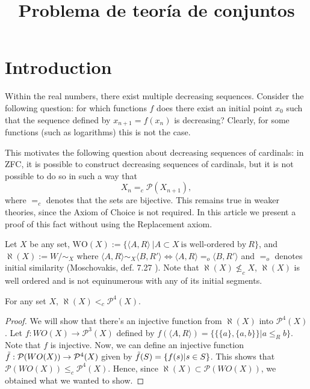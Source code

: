 \documentclass{article}
\title{Problema de teoría de conjuntos}
\begin{document}
	

\section*{Introduction}

Within the real numbers, there exist multiple decreasing sequences. Consider the following question: for which functions \(f\) does there exist an initial point \(x_0\) such that the sequence defined by \(x_{n+1} = f(x_n)\) is decreasing? Clearly, for some functions (such as logarithms) this is not the case.

This motivates the following question about decreasing sequences of cardinals: in ZFC, it is possible to construct decreasing sequences of cardinals, but it is not possible to do so in such a way that
\[
X_n =_c \mathcal{P}(X_{n+1}),
\]
where $=_c$ denotes that the sets are bijective. This remains true in weaker theories, since the Axiom of Choice is not required. In this article we present a proof of this fact without using the Replacement axiom.

\begin{definition}\label{aleph}
    Let $X$ be any set, $\text{WO}(X):=\{\langle A,R\rangle\ |A\subset X \ \text{is well-ordered by}\ R\}$, 
    and $\aleph(X):= W/{\sim_X}$ 
    where $\langle A,R\rangle \sim_X \langle B, R'\rangle \Longleftrightarrow \langle A, R\rangle =_o \langle B, R'\rangle$ and $=_o$ denotes initial similarity (Moschovakis, def. 7.27 \cite{Moscho}).
    Note that $\aleph(X)\nleq_c X$, $\aleph(X)$ is well ordered and is not equinumerous with any of its initial segments.
\end{definition}


\begin{theorem}
	For any set $X$, $\aleph(X)<_c \mathcal{P}^4(X)$.
\end{theorem}

\begin{proof}
We will show that there's an injective function from $\aleph(X)$ into $\mathcal{P}^4(X)$. Let $f:WO(X)\rightarrow \mathcal{P}^3(X)$ defined by $f(\langle A,R\rangle) = \{\{\{a\},\{a,b\}\}| a\leq_R b\}$. Note that $f$ is injective. Now, we can define an injective function $\Tilde{f}: \mathcal{P} (WO(X)) \rightarrow \mathcal{P}^4(X)$ given by $\Tilde{f}(S) = \{f(s) | s\in S\}$. This shows that $\mathcal{P} (WO(X)) \leq_c \mathcal{P}^4(X)$. Hence, since $\aleph (X) \subset \mathcal{P} (WO(X))$, we obtained what we wanted to show.
\end{proof}
\end{document}
